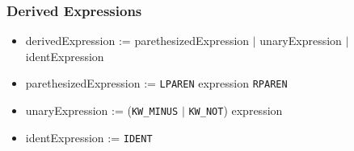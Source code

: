 \subsubsection{Derived Expressions}

\begin{itemize}
	\item derivedExpression := parethesizedExpression $|$ unaryExpression $|$ identExpression
	\item parethesizedExpression := \texttt{LPAREN} expression \texttt{RPAREN}
	\item unaryExpression := (\texttt{KW\_MINUS} $|$ \texttt{KW\_NOT}) expression
	\item identExpression := \texttt{IDENT}
\end{itemize}















